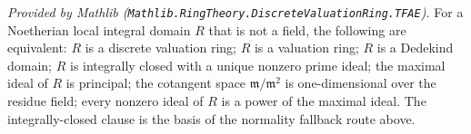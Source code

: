 \begin{lemma}
  \label{lem:isDiscreteValuationRing_TFAE}
  \mathlibok
  \textit{Provided by Mathlib
  (\texttt{Mathlib.RingTheory.DiscreteValuationRing.TFAE}).}
  For a Noetherian local integral domain \(R\) that is not a field, the
  following are equivalent: \(R\) is a discrete valuation ring; \(R\) is a
  valuation ring; \(R\) is a Dedekind domain; \(R\) is integrally closed with
  a unique nonzero prime ideal; the maximal ideal of \(R\) is principal; the
  cotangent space \(\mathfrak m / \mathfrak m^2\) is one-dimensional over the
  residue field; every nonzero ideal of \(R\) is a power of the maximal
  ideal. The integrally-closed clause is the basis of the normality fallback
  route above.
\end{lemma}
